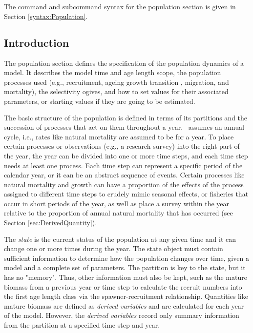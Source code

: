 \section{}\label{sec:Population}

The command and subcommand syntax for the population section is given in Section \ref{syntax:Population}.

\subsection{Introduction}

The population section defines the specification of the population dynamics of a model. It describes the model time and \ifAgeBased age \else length \fi scope, the population processes used (e.g., recruitment, \ifAgeBased ageing \else growth transition \fi, migration, and mortality), the selectivity ogives, and how to set values for their associated parameters, or starting values if they are going to be estimated.

The basic structure of the population is defined in terms of its partitions and the succession of processes that act on them throughout a year. \CNAME\ assumes an annual cycle, i.e., rates like natural mortality are assumed to be for a year. To place certain processes or observations (e.g., a research survey) into the right part of the year, the year can be divided into one or more time steps, and each time step needs  at least one process. Each time step can represent a specific period of the calendar year, or it can be an abstract sequence of events. Certain processes like natural mortality and growth can have a proportion of the effects of the process assigned to different time steps to crudely mimic seasonal effects, or fisheries that occur in short periods of the year, as well as place a survey within the year relative to the proportion of annual natural mortality that has occurred (see Section \ref{sec:DerivedQuantity}).

The \emph{state} is the current status of the population at any given time and it can change one or more times during the year. The state object must contain sufficient information to determine how the population changes over time, given a model and a complete set of parameters. The partition is key to the state, but it has no "memory". Thus, other information must also be kept, such as the mature biomass from a previous year or time step to calculate the recruit numbers into the first \ifAgeBased age \else length \fi class via the spawner-recruitment relationship. Quantities like mature biomass are defined as \emph{derived variables} and are calculated for each year of the model. However, the \emph{derived variables} record only summary information from the partition at a specified time step and year.

